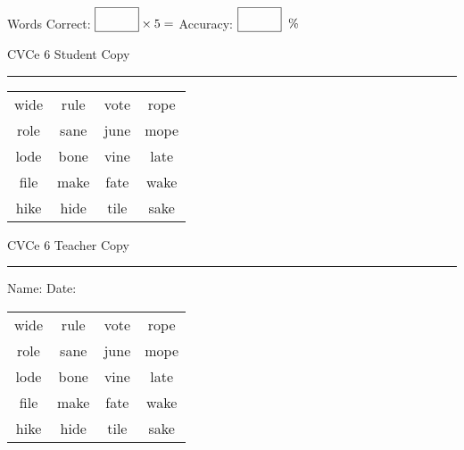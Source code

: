 \documentclass{memoir}
\begin{document}
\small

Words Correct: $\fbox{\phantom{\huge 100}} \times 5 = $ Accuracy: $\fbox{\phantom{\huge 100}}\;\; \%$ 

\vfill

\newpage


\footnotesize \noindent
CVCe 6 \hfill Student Copy
\smallskip
\hrule

\Large

\setlength{\tabcolsep}{14pt}
\def\arraystretch{2}

{\selectfont


\begin{vplace}[0.5]
\begin{center}
\begin{tabular}{cccc}
wide & rule & vote & rope \\
role & sane & june & mope \\
lode & bone & vine & late \\
file & make & fate & wake \\
hike & hide & tile & sake \\
\end{tabular}
\end{center}
\end{vplace}

}

\newpage

\footnotesize \noindent
CVCe 6 \hfill Teacher Copy
\smallskip
\hrule

\small

\vfill

\noindent
Name: \underline{\hspace{1.75in}} \hfill Date: \underline{\hspace{1in}}

\Large

{\selectfont


\begin{vplace}[0.5]
\begin{center}
\begin{tabular}{cccc}
wide & rule & vote & rope \\
role & sane & june & mope \\
lode & bone & vine & late \\
file & make & fate & wake \\
hike & hide & tile & sake \\
\end{tabular}
\end{center}
\end{vplace}



}
\end{document}
